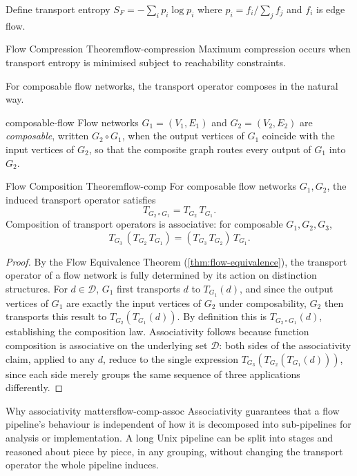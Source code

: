\documentclass[12pt,twoside,openright]{book}
\begin{document}
Define transport entropy $S_F = -\sum_i p_i\log p_i$
where $p_i = f_i / \sum_j f_j$ and $f_i$ is edge flow.

\begin{theorem}{Flow Compression Theorem}{flow-compression}
  Maximum compression occurs when transport entropy is
  minimised subject to reachability constraints.
\end{theorem}

For composable flow networks, the transport operator
composes in the natural way.

\begin{definition}{composable-flow}
  Flow networks $G_1 = (V_1, E_1)$ and $G_2 = (V_2, E_2)$
  are \emph{composable}, written $G_2 \circ G_1$, when the
  output vertices of $G_1$ coincide with the input vertices
  of $G_2$, so that the composite graph routes every output
  of $G_1$ into $G_2$.
\end{definition}

\begin{theorem}{Flow Composition Theorem}{flow-comp}
  For composable flow networks $G_1, G_2$, the induced
  transport operator satisfies
  \[
    T_{G_2 \circ G_1} = T_{G_2} \, T_{G_1}.
  \]
  Composition of transport operators is associative: for
  composable $G_1, G_2, G_3$,
  \[
    T_{G_3}\,(T_{G_2}\,T_{G_1})
    = (T_{G_3}\,T_{G_2})\,T_{G_1}.
  \]
\end{theorem}

\begin{proof}
  By the Flow Equivalence Theorem
  (\cref{thm:flow-equivalence}), the transport operator
  of a flow network is fully determined by its action on
  distinction structures. For $d \in \mathcal{D}$,
  $G_1$ first transports $d$ to $T_{G_1}(d)$, and since the
  output vertices of $G_1$ are exactly the input vertices of
  $G_2$ under composability, $G_2$ then transports this
  result to $T_{G_2}(T_{G_1}(d))$. By definition this is
  $T_{G_2 \circ G_1}(d)$, establishing the composition law.
  Associativity follows because function composition is
  associative on the underlying set $\mathcal{D}$: both
  sides of the associativity claim, applied to any $d$,
  reduce to the single expression
  $T_{G_3}(T_{G_2}(T_{G_1}(d)))$, since each side merely
  groups the same sequence of three applications differently.
\end{proof}

\begin{remark}{Why associativity matters}{flow-comp-assoc}
  Associativity guarantees that a flow pipeline's behaviour
  is independent of how it is decomposed into sub-pipelines
  for analysis or implementation. A long Unix pipeline can be
  split into stages and reasoned about piece by piece, in any
  grouping, without changing the transport operator the whole
  pipeline induces.
\end{remark}
\end{document}
